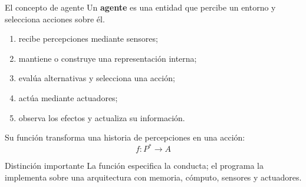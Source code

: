 \documentclass[aspectratio=169,11pt]{beamer}
\newcommand{\concepto}[1]{\textcolor{UAPTeal}{\textbf{#1}}}
\begin{document}
\begin{frame}{El concepto de agente}
  Un \concepto{agente} es una entidad que percibe un entorno y selecciona acciones sobre él.
  \begin{enumerate}
    \item recibe percepciones mediante sensores;
    \item mantiene o construye una representación interna;
    \item evalúa alternativas y selecciona una acción;
    \item actúa mediante actuadores;
    \item observa los efectos y actualiza su información.
  \end{enumerate}
  Su función transforma una historia de percepciones en una acción:
  \[
    f:P^*\longrightarrow A
  \]
  \begin{block}{Distinción importante}
    La función especifica la conducta; el programa la implementa sobre una arquitectura con memoria, cómputo, sensores y actuadores.
  \end{block}
\end{frame}
\end{document}
